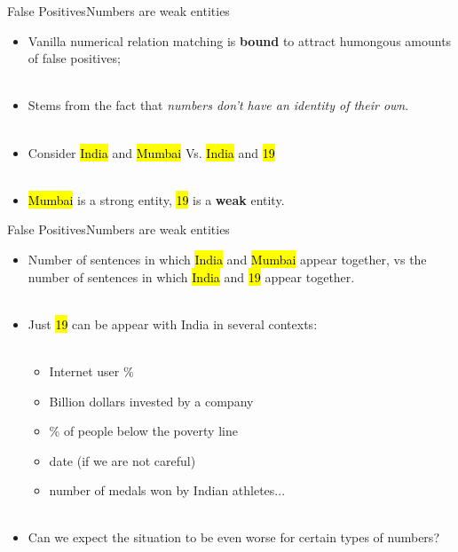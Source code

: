 \documentclass{beamer}
\makeatletter
\newcommand\SoulColor{%
  \let\set@color\beamerorig@set@color
  \let\reset@color\beamerorig@reset@color}
\makeatother
\begin{document}
\begin{frame}{False Positives}{Numbers are weak entities}
\begin{itemize}
 \item Vanilla numerical relation matching is \textbf{bound} to attract humongous amounts of false positives; \pause \\~\\
 \item Stems from the fact that \emph{numbers don't have an identity of their own}. \pause \\~\\
 \item Consider {\SoulColor\hl{India}} and {\SoulColor\hl{Mumbai}} Vs. {\SoulColor\hl{India}} and {\SoulColor\hl{19}} \pause \\~\\
 \item {\SoulColor\hl{Mumbai}} is a strong entity, {\SoulColor\hl{19}} is a \textbf{weak} entity. 
 \end{itemize}
\end{frame}
\begin{frame}{False Positives}{Numbers are weak entities}
 \begin{itemize}  
 \item Number of sentences in which {\SoulColor\hl{India}} and {\SoulColor\hl{Mumbai}} appear together, vs the number of sentences
  in which {\SoulColor\hl{India}} and {\SoulColor\hl{19}} appear together. \pause \\~\\
 \item Just {\SoulColor\hl{19}} can be appear with India in several contexts: \pause \\~\\
 \begin{itemize} 
 \item Internet user \% \pause 
 \item Billion dollars invested by a company \pause 
 \item \% of people below the poverty line \pause 
 \item date (if we are not careful) \pause 
 \item number of medals won by Indian athletes... \pause \\~\\
\end{itemize} 

 \item Can we expect the situation to be even worse for certain types of numbers?
\end{itemize}
\end{frame}
\end{document}
